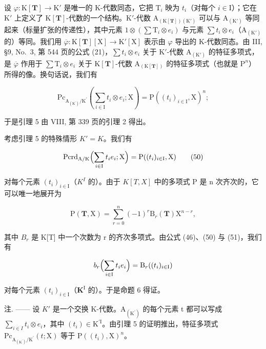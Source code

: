 设 \(\varphi : \mathrm{K}[\mathbf{T}] \to \mathrm{K}'\) 是唯一的 K-代数同态，它把 \(\mathrm{T}_i\) 映为 \(t_i\)（对每个 \(i \in \mathrm{I}\)）；它在 \(\mathrm{K}'\) 上定义了 \(\mathrm{K}[\mathbf{T}]\)-代数的一个结构。\(\mathrm{K}'\)-代数 \(\mathrm{A}_{(\mathrm{K}[\mathbf{T}])(\mathrm{K}')}\) 可以与 \(\mathrm{A}_{(\mathrm{K}')}\) 等同起来（标量扩张的传递性），其中元素 \(1 \otimes (\sum \mathrm{T}_i \otimes e_i)\) 与元素 \(\sum t_i \otimes e_i\)（\(\mathrm{A}_{(\mathrm{K}')}\) 的）等同。我们用 \(\overline{\varphi}: \mathrm{K}[\mathbf{T}][\mathrm{X}] \to \mathrm{K}'[\mathrm{X}]\) 表示由 \(\varphi\) 导出的 K-代数同态。由 III, §9, No.~3, 第 544 页的公式 (21)，\(\sum t_i \otimes e_i\) 关于 \(\mathrm{K}'\)-代数 \(\mathrm{A}_{(\mathrm{K}')}\) 的特征多项式，是 \(\overline{\varphi}\) 作用于 \(\sum \mathrm{T}_i \otimes e_i\) 关于 \(\mathrm{K}[\mathbf{T}]\)-代数 \(\mathrm{A}_{(\mathrm{K}[\mathbf{T}])}\) 的特征多项式（也就是 \(\mathrm{P}^n\)）所得的像。换句话说，我们有

\[
\mathrm{Pc} _ {\mathrm{A} _ {(\mathrm{K} ^ {\prime})} / \mathrm{K} ^ {\prime}} \left(\sum_ {i \in \mathrm{I}} t _ {i} \otimes e _ {i}; \mathrm{X}\right) = \mathrm{P} ((t _ {i}) _ {i \in \mathrm{I}}, \mathrm{X}) ^ {n};\tag{49}
\]

于是引理 5 由 VIII, 第 339 页的引理 2 得出。

考虑引理 5 的特殊情形 \(K' = K\)。我们有

\[
\mathrm{Pcrd} _ {\mathrm{A/K}} \Bigl (\sum_ {i \in \mathrm{I}} t _ {i} e _ {i}; \mathrm{X} \Bigr) = \mathrm{P} ((t _ {i}) _ {i \in \mathrm{I}}, \mathrm{X})\tag{50}
\]

对每个元素 \((t_{i})_{i\in\mathrm{I}}\)（\(K^{I}\) 的）。由于 \(K[T,X]\) 中的多项式 P 是 n 次齐次的，它可以唯一地展开为

\[
\mathrm{P} (\mathbf {T}, \mathrm{X}) = \sum_ {r = 0} ^ {n} (- 1) ^ {r} \mathrm{B} _ {r} (\mathbf {T}) \mathrm{X} ^ {n - r},\tag{51}
\]

其中 \(B_{r}\) 是 K{[}T{]} 中一个次数为 r 的齐次多项式。由公式 (46)、(50) 与 (51)，我们有

\[
b _ {r} \Bigl (\sum_ {i \in \mathrm{I}} t _ {i} e _ {i} \Bigr) = \mathrm{B} _ {r} ((t _ {i}) _ {i \in \mathrm{I}})
\]

对每个元素 \((t_i)_{i\in \mathrm{I}}\)（\(\mathbf{K}^{\mathrm{I}}\) 的）。于是命题 6 得证。

注. —— 设 \(K'\) 是一个交换 K-代数。\(\mathrm{A}_{(\mathrm{K}^{\prime})}\) 的每个元素 t 都可以写成 \(\sum_{i\in I}t_{i}\otimes e_{i}\)，其中 \((t_{i})\in\mathrm{K}^{\prime\mathrm{I}}\)。由引理 5 的证明推出，特征多项式 \(\mathrm{Pc}_{\mathrm{A}_{(\mathrm{K}^{\prime})}/\mathrm{K}^{\prime}}(t;\mathrm{X})\) 等于 \(\mathrm{P}((t_{i}),\mathrm{X})^{n}\)。
